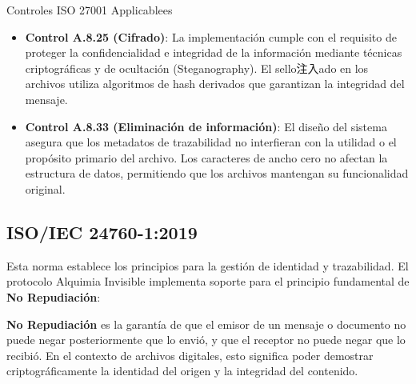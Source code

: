 \begin{caja}{Controles ISO 27001 Applicablees}
\begin{itemize}
\item \textbf{Control A.8.25 (Cifrado)}: La implementación cumple con el requisito de proteger la confidencialidad e integridad de la información mediante técnicas criptográficas y de ocultación (Steganography). El sello注入ado en los archivos utiliza algoritmos de hash derivados que garantizan la integridad del mensaje.

\item \textbf{Control A.8.33 (Eliminación de información)}: El diseño del sistema asegura que los metadatos de trazabilidad no interfieran con la utilidad o el propósito primario del archivo. Los caracteres de ancho cero no afectan la estructura de datos, permitiendo que los archivos mantengan su funcionalidad original.
\end{itemize}
\end{caja}


\subsection{ISO/IEC 24760-1:2019}

Esta norma establece los principios para la gestión de identidad y trazabilidad. El protocolo Alquimia Invisible implementa soporte para el principio fundamental de \textbf{No Repudiación}:

\begin{definicion}
\textbf{No Repudiación} es la garantía de que el emisor de un mensaje o documento no puede negar posteriormente que lo envió, y que el receptor no puede negar que lo recibió. En el contexto de archivos digitales, esto significa poder demostrar criptográficamente la identidad del origen y la integridad del contenido.
\end{definicion}


